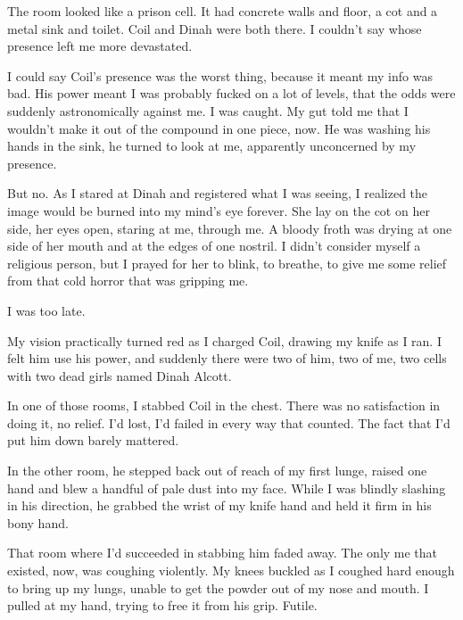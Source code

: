 The room looked like a prison cell.  It had concrete walls and floor, a cot and a metal sink and toilet.  Coil and Dinah were both there.  I couldn't say whose presence left me more devastated.



I could say Coil's presence was the worst thing, because it meant my info was bad.  His power meant I was probably fucked on a lot of levels, that the odds were suddenly astronomically against me.  I was caught.  My gut told me that I wouldn't make it out of the compound in one piece, now.  He was washing his hands in the sink, he turned to look at me, apparently unconcerned by my presence.



But no.  As I stared at Dinah and registered what I was seeing, I realized the image would be burned into my mind's eye forever.  She lay on the cot on her side, her eyes open, staring at me, through me.  A bloody froth was drying at one side of her mouth and at the edges of one nostril.  I didn't consider myself a religious person, but I prayed for her to blink, to breathe, to give me some relief from that cold horror that was gripping me.



I was too late.



My vision practically turned red as I charged Coil, drawing my knife as I ran.  I felt him use his power, and suddenly there were two of him, two of me, two cells with two dead girls named Dinah Alcott.



In one of those rooms, I stabbed Coil in the chest.  There was no satisfaction in doing it, no relief.  I'd lost, I'd failed in every way that counted.  The fact that I'd put him down barely mattered.



In the other room, he stepped back out of reach of my first lunge, raised one hand and blew a handful of pale dust into my face.  While I was blindly slashing in his direction, he grabbed the wrist of my knife hand and held it firm in his bony hand.



That room where I'd succeeded in stabbing him faded away.  The only me that existed, now, was coughing violently.  My knees buckled as I coughed hard enough to bring up my lungs, unable to get the powder out of my nose and mouth.  I pulled at my hand, trying to free it from his grip.  Futile.



